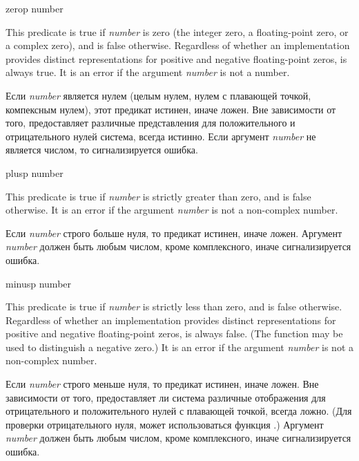 \begin{defun}[Function]
zerop number

This predicate is true if \emph{number} is zero (the integer zero,
a floating-point zero, or a complex zero), and is false otherwise.
Regardless of whether an implementation provides distinct representations
for positive and negative floating-point zeros,
 is always true.
It is an error if the argument \emph{number} is not a number.

Если \emph{number} является нулем (целым нулем, нулем с
плавающей точкой, компексным нулем), этот предикат истинен, иначе ложен.
Вне зависимости от того, предоставляет различные представления для
положительного и отрицательного нулей система,  всегда истинно.
Если аргумент \emph{number} не является числом, то сигнализируется ошибка.
\end{defun}

\begin{defun}[Function]
plusp number

This predicate is true if \emph{number} is strictly greater than zero,
and is false otherwise.
It is an error if the argument \emph{number} is not a non-complex number.

Если \emph{number} строго больше нуля, то предикат истинен, иначе ложен.
Аргумент \emph{number} должен быть любым числом, кроме комплексного, иначе
сигнализируется ошибка. 
\end{defun}

\begin{defun}[Function]
minusp number

This predicate is true if \emph{number} is strictly less than zero,
and is false otherwise.
Regardless of whether an implementation provides distinct representations
for positive and negative floating-point zeros,
 is always false.
(The function  may be used to distinguish a negative zero.)
It is an error if the argument \emph{number} is not a non-complex number.

Если \emph{number} строго меньше нуля, то предикат истинен, иначе ложен.
Вне зависимости от того, предоставляет ли система различные отображения для
отрицательного и положительного нулей с плавающей точкой, 
всегда ложно.
(Для проверки отрицательного нуля, может использоваться функция
.)
Аргумент \emph{number} должен быть любым числом, кроме комплексного, иначе
сигнализируется ошибка. 
\end{defun}

